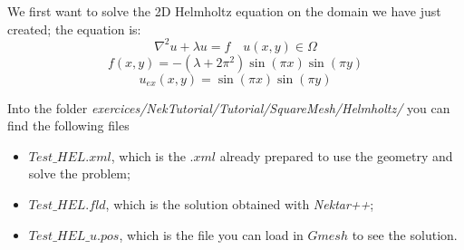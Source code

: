 \documentclass[12pt]{article}
\begin{document}
We first want to solve the 2D Helmholtz equation on the domain we have just created; the equation is:
\begin{equation}
\nabla^2 u + \lambda u = f \quad u(x,y) \in \Omega
 \end{equation}
 \begin{equation}
f(x,y)= -(\lambda + 2\pi^2)\sin(\pi x)\sin(\pi y)
 \end{equation}
\begin{equation}
u_{ex}(x,y)= \sin(\pi x)\sin(\pi y)
 \end{equation}
 
 \noindent
 Into the folder \emph{exercices/NekTutorial/Tutorial/SquareMesh/Helmholtz/} you can find the following files
 \begin{itemize}
 \item $Test\_HEL.xml$, which is the $.xml$ already prepared to use the geometry and solve the problem;
 \item $Test\_HEL.fld$, which is the solution obtained with \emph{Nektar++};
 \item $Test\_HEL\_u.pos$, which is the file you can load in $Gmesh$ to see the solution.
 \end{itemize} 
\end{document}
